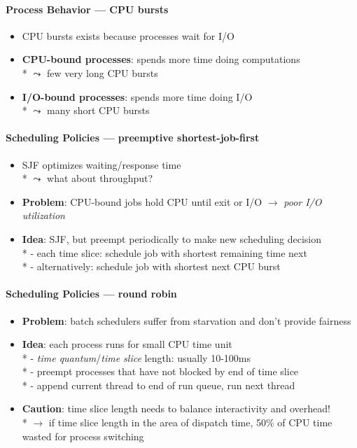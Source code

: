 \paragraph{Process Behavior --- CPU bursts}
\begin{itemize}
  \item CPU bursts exists because processes wait for I/O
  \item \textbf{CPU-bound processes}: spends more time doing computations \\*
    \( \leadsto \) few very long CPU bursts
  \item \textbf{I/O-bound processes}: spends more time doing I/O \\*
    \( \leadsto \) many short CPU bursts
\end{itemize}

\paragraph{Scheduling Policies --- preemptive shortest-job-first}
\begin{itemize}
  \item SJF optimizes waiting/response time \\*
    \( \leadsto \) what about throughput?
  \item \textbf{Problem}: CPU-bound jobs hold CPU until exit or I/O \( \to \) \emph{poor I/O utilization}
  \item \textbf{Idea}: SJF, but preempt periodically to make new scheduling decision \\*
    - each time slice: schedule job with shortest remaining time next \\*
    - alternatively: schedule job with shortest next CPU burst
\end{itemize}

\paragraph{Scheduling Policies --- round robin}
\begin{itemize}
  \item \textbf{Problem}: batch schedulers suffer from starvation and don't provide fairness
  \item \textbf{Idea}: each process runs for small CPU time unit \\*
    - \emph{time quantum}/\emph{time slice} length: usually 10-100ms \\*
    - preempt processes that have not blocked by end of time slice \\*
    - append current thread to end of run queue, run next thread
  \item \textbf{Caution}: time slice length needs to balance interactivity and overhead! \\*
    \( \to \) if time slice length in the area of dispatch time, 50\% of CPU time wasted for process switching
\end{itemize}


